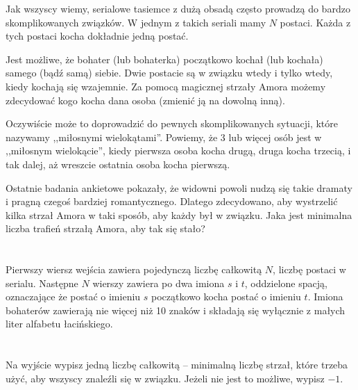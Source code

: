 \ifx\boi\undefined\fi
\def\version{jury-1}

Jak wszyscy wiemy, serialowe tasiemce z dużą obsadą często prowadzą do bardzo skomplikowanych związków.
W jednym z takich seriali mamy $N$ postaci. Każda z tych postaci kocha dokładnie jedną postać.

Jest możliwe, że bohater (lub bohaterka) początkowo kochał (lub kochała) samego (bądź samą) siebie.
Dwie postacie są w związku wtedy i tylko wtedy, kiedy kochają się wzajemnie.
Za pomocą magicznej strzały Amora możemy zdecydować kogo kocha dana osoba (zmienić ją na dowolną inną).

Oczywiście może to doprowadzić do pewnych skomplikowanych sytuacji, które nazywamy ,,miłosnymi wielokątami''.
Powiemy, że 3 lub więcej osób jest w ,,miłosnym wielokącie'', kiedy pierwsza osoba kocha drugą, druga kocha trzecią,
i tak dalej, aż wreszcie ostatnia osoba kocha pierwszą.

Ostatnie badania ankietowe pokazały, że widowni powoli nudzą się takie dramaty i pragną
czegoś bardziej romantycznego. Dlatego zdecydowano, aby wystrzelić kilka strzał Amora w taki sposób,
aby każdy był w związku. Jaka jest minimalna liczba trafień strzałą Amora, aby tak się stało?

\section*{}
Pierwszy wiersz wejścia zawiera pojedynczą liczbę całkowitą $N$, liczbę postaci w serialu.
Następne $N$ wierszy zawiera po dwa imiona $s$ i $t$, oddzielone spacją, oznaczające
że postać o imieniu $s$ początkowo kocha postać o imieniu $t$. Imiona bohaterów zawierają
nie więcej niż 10 znaków i składają się wyłącznie z małych liter alfabetu łacińskiego. %

\section*{\outputsection}
Na wyjście wypisz jedną liczbę całkowitą -- minimalną liczbę strzał, które trzeba użyć, aby wszyscy
znaleźli się w związku. Jeżeli nie jest to możliwe, wypisz $-1$.

\section*{\constraints}
\testgroups

